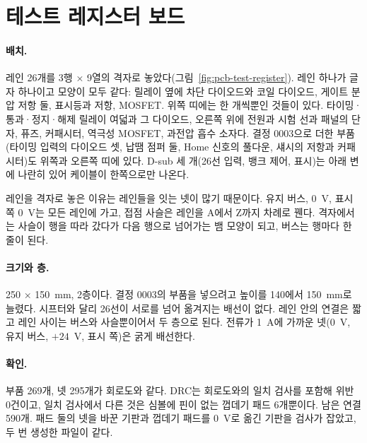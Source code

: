 
\section{테스트 레지스터 보드}\label{pcb:test-register}

\paragraph{배치.} 레인 26개를 3행 × 9열의 격자로 놓았다(그림~\ref{fig:pcb-test-register}). 레인 하나가 글자
하나이고 모양이 모두 같다: 릴레이 옆에 차단 다이오드와 코일 다이오드, 게이트 분압 저항 둘, 표시등과 저항,
MOSFET. 위쪽 띠에는 한 개씩뿐인 것들이 있다. 타이밍·통과·정지·해제 릴레이 여덟과 그 다이오드, 오른쪽 위에
전원과 시험 선과 패널의 단자, 퓨즈, 커패시터, 역극성 MOSFET, 과전압 흡수 소자다. 결정 0003으로 더한 부품(타이밍
입력의 다이오드 셋, 납땜 점퍼 둘, Home 신호의 풀다운, 섀시의 저항과 커패시터)도 위쪽과 오른쪽 띠에 있다. D-sub 세
개(26선 입력, 뱅크 제어, 표시)는 아래 변에 나란히 있어 케이블이 한쪽으로만 나온다.

레인을 격자로 놓은 이유는 레인들을 잇는 넷이 많기 때문이다. 유지 버스, 0~V, 표시 쪽 0~V는 모든 레인에
가고, 접점 사슬은 레인을 A에서 Z까지 차례로 꿴다. 격자에서는 사슬이 행을 따라 갔다가 다음 행으로 넘어가는
뱀 모양이 되고, 버스는 행마다 한 줄이 된다.

\paragraph{크기와 층.} 250 × 150~mm, 2층이다. 결정 0003의 부품을 넣으려고 높이를 140에서 150~mm로 늘렸다.
시프터와 달리 26선이 서로를 넘어 옮겨지는 배선이 없다. 레인 안의 연결은 짧고 레인 사이는 버스와 사슬뿐이어서 두
층으로 된다. 전류가 1~A에 가까운 넷(0~V, 유지 버스, $+24$~V, 표시 쪽)은 굵게 배선한다.

\paragraph{확인.} 부품 269개, 넷 295개가 회로도와 같다. DRC는 회로도와의 일치 검사를 포함해 위반 0건이고, 일치
검사에서 다른 것은 심볼에 핀이 없는 껍데기 패드 6개뿐이다. 남은 연결 590개. 패드 둘의 넷을 바꾼 기판과 껍데기 패드를
0~V로 옮긴 기판을 검사가 잡았고, 두 번 생성한 파일이 같다.

